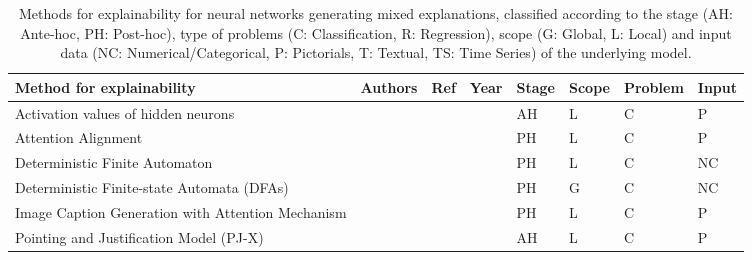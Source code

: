 \documentclass[final,1p,times]{elsarticle}
\begin{document}
\begin{table}[h!]
\footnotesize
    \caption{Methods for explainability for neural networks generating mixed explanations, classified according to the stage (AH: Ante-hoc, PH: Post-hoc), type of problems (C: Classification, R: Regression), scope (G: Global, L: Local) and input data (NC: Numerical/Categorical, P: Pictorials, T: Textual, TS: Time Series) of the underlying model.}
    \label{tab:neural-networks-mixed}
    \begin{tabular}{m{4.5cm} m{2cm} m{0.5cm} m{0.5cm} m{0.5cm} m{0.6cm} m{0.8cm} m{0.8cm}}
    \hline
    Method for explainability & Authors & Ref & Year & Stage & Scope & Problem & Input\\
    \hline
    Activation values of hidden neurons &  \citeauthor{tamajka2019transforming} &  \cite{tamajka2019transforming} &  \citeyear{tamajka2019transforming} & AH & L & C & P\\
    Attention Alignment &  \citeauthor{kim2018textual} &  \cite{kim2018textual} &  \citeyear{kim2018textual} & PH & L & C & P\\
    Deterministic Finite Automaton &  \citeauthor{mayr2018regular} &  \cite{mayr2018regular} &  \citeyear{mayr2018regular} & PH & L & C & NC\\
    Deterministic Finite-state Automata (DFAs) &  \citeauthor{omlin1996extraction} &  \cite{omlin1996extraction} &  \citeyear{omlin1996extraction} & PH & G & C & NC\\
    Image Caption Generation with Attention Mechanism &  \citeauthor{xuk2015show} &  \cite{xuk2015show} &  \citeyear{xuk2015show} & PH & L & C & P\\
    Pointing and Justification Model (PJ-X) &  \citeauthor{park2018multimodal} &  \cite{park2018multimodal} &  \citeyear{park2018multimodal} & AH & L & C & P\\
    \hline
\end{tabular}
\end{table}
\end{document}
